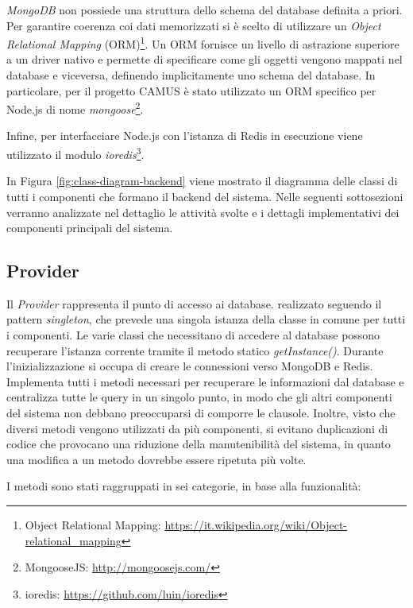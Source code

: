 \emph{MongoDB} non possiede una struttura dello schema del database definita a priori. Per garantire coerenza coi dati memorizzati si è scelto di utilizzare un \emph{Object Relational Mapping} (ORM)\footnote{Object Relational Mapping: \url{https://it.wikipedia.org/wiki/Object-relational_mapping}}. Un ORM fornisce un livello di astrazione superiore a un driver nativo e permette di specificare come gli oggetti vengono mappati nel database e viceversa, definendo implicitamente uno schema del database. In particolare, per il progetto CAMUS è stato utilizzato un ORM specifico per Node.js di nome \emph{mongoose}\footnote{MongooseJS: \url{http://mongoosejs.com/}}.

Infine, per interfacciare Node.js con l'istanza di Redis in esecuzione viene utilizzato il modulo \emph{ioredis}\footnote{ioredis: \url{https://github.com/luin/ioredis}}.

In Figura \ref{fig:class-diagram-backend} viene mostrato il diagramma delle classi di tutti i componenti che formano il backend del sistema. Nelle seguenti sottosezioni verranno analizzate nel dettaglio le attività svolte e i dettagli implementativi dei componenti principali del sistema.

\subsection{Provider\label{sec:provider}}

Il \emph{Provider} rappresenta il punto di accesso ai database. \upe realizzato seguendo il pattern \emph{singleton}, che prevede una singola istanza della classe in comune per tutti i componenti. Le varie classi che necessitano di accedere al database possono recuperare l'istanza corrente tramite il metodo statico \emph{getInstance()}. Durante l'inizializzazione si occupa di creare le connessioni verso MongoDB e Redis. Implementa tutti i metodi necessari per recuperare le informazioni dal database e centralizza tutte le query in un singolo punto, in modo che gli altri componenti del sistema non debbano preoccuparsi di comporre le clausole. Inoltre, visto che diversi metodi vengono utilizzati da più componenti, si evitano duplicazioni di codice che provocano una riduzione della manutenibilità del sistema, in quanto una modifica a un metodo dovrebbe essere ripetuta più volte.

I metodi sono stati raggruppati in sei categorie, in base alla funzionalità:

